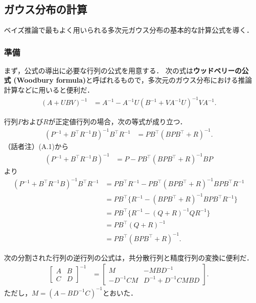 \documentclass[11pt,a4paper]{jsarticle}
\begin{document}
\appendix
\section{}
\subsection{ガウス分布の計算}
ベイズ推論で最もよく用いられる多次元ガウス分布の基本的な計算公式を導く．

\subsubsection{準備}
まず，公式の導出に必要な行列の公式を用意する．
次の式は\textbf{ウッドベリーの公式 (Woodbury formula)}と呼ばれるもので，多次元のガウス分布における推論計算などに用いると便利だ．
\begin{align}
(A + U B V)^{-1}
& =
A^{-1} - A^{-1} U (B^{-1} + V A^{-1} U)^{-1} V A^{-1}.
\end{align}

行列$P$および$R$が正定値行列の場合，次の等式が成り立つ．
\begin{align}
(P^{-1} + B^\top R^{-1} B)^{-1} B^\top R^{-1}
& =
P B^\top (B P B^\top + R)^{-1}.
\end{align}
（話者注）(A.1)から
\begin{align}
(P^{-1} + B^\top R^{-1} B)^{-1}
& =
P - P B^\top (B P B^\top + R)^{-1} B P \nonumber
\end{align}
より
\begin{align}
(P^{-1} + B^\top R^{-1} B)^{-1} B^\top R^{-1}
& =
P B^\top R^{-1} - P B^\top (B P B^\top + R)^{-1} B P B^\top R^{-1} \nonumber \\
& =
P B^\top \bigl\{ R^{-1} - (B P B^\top + R)^{-1} B P B^\top R^{-1} \bigr\} \nonumber \\
& =
P B^\top \bigl\{ R^{-1} - (Q + R)^{-1} Q R^{-1} \bigr\} \nonumber \\
& =
P B^\top (Q + R)^{-1} \nonumber \\
& =
P B^\top (B P B^\top + R)^{-1}. \nonumber
\end{align}

次の分割された行列の逆行列の公式は，共分散行列と精度行列の変換に便利だ．
\begin{align}
\begin{bmatrix}
A & B \\
C & D
\end{bmatrix}^{-1}
& =
\begin{bmatrix}
M & -MBD^{-1} \\
-D^{-1}CM & D^{-1} + D^{-1}CMBD
\end{bmatrix}.
\end{align}
ただし，$M = (A - B D^{-1}C)^{-1}$とおいた．
\end{document}

